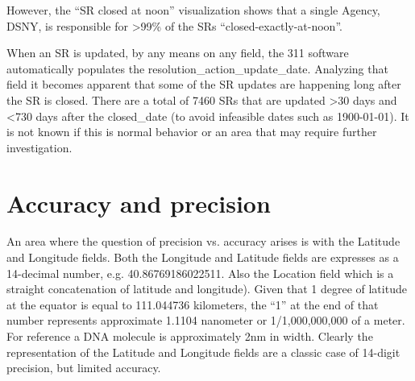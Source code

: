 \documentclass[12pt, titlepage]{article}
\begin{document}
However, the ``SR closed at noon'' visualization shows that  a single 
Agency, DSNY, is responsible for \textgreater99\% of the 
SRs ``closed-exactly-at-noon''. 
	
	
		
\label{sec: resolutionaction}
When an SR is updated, by any means on any field, the 311 software 
automatically populates the resolution\_action\_update\_date. 
Analyzing that field it becomes apparent that some of the SR updates 
are happening long after the SR is closed. There are a 
total of 7460 SRs that are updated \textgreater30 days and \textless{}730 
days after the closed\_date (to avoid infeasible dates such as 1900-01-01).
It is not known if this is normal behavior or an area that may 
require further investigation. 
	
	


	
\section{Accuracy and precision}
\label{sec:precision}
An area where the question of precision vs. accuracy arises is
with the Latitude and Longitude fields. Both the Longitude and 
Latitude fields are expresses as a 14-decimal 
number, e.g. 40.86769186022511. Also the Location field which is a 
straight concatenation of latitude and longitude). Given that 1 
degree of latitude at the equator is equal to 111.044736 kilometers, 
the ``1'' at the end of that number represents approximate 1.1104 nanometer 
or 1/1,000,000,000 of a meter. For reference a DNA molecule is 
approximately 2nm in width. Clearly the representation of 
the Latitude and Longitude fields are a classic case of 14-digit 
precision, but limited accuracy. 
\end{document}
